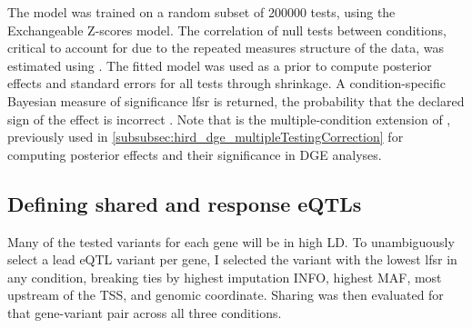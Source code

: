 The  model was trained on a random subset of 200000 tests, using the Exchangeable Z-scores model\autocite{urbut2018FlexibleStatisticalMethods}.
The correlation of null tests between conditions, critical to account for due to the repeated measures structure of the data, was estimated using .
The fitted model was used as a prior to compute posterior effects and standard errors for all tests through shrinkage.
%
A condition-specific Bayesian measure of significance \gls{lfsr} is returned, 
the probability that the declared sign of the effect is incorrect \autocite{stephens2016FalseDiscoveryRates}.
Note that  is the multiple-condition extension of , 
previously used in \cref{subsubsec:hird_dge_multipleTestingCorrection} for computing posterior effects and their significance in \gls{DGE} analyses.

\subsection{Defining shared and response eQTLs}

Many of the tested variants for each gene will be in high \gls{LD}.
To unambiguously select a lead \gls{eQTL} variant per gene, I selected the variant with the lowest lfsr in any condition, 
breaking ties by highest imputation INFO, highest \gls{MAF}, most upstream of the \gls{TSS}, and genomic coordinate.
Sharing was then evaluated for that gene-variant pair across all three conditions.

